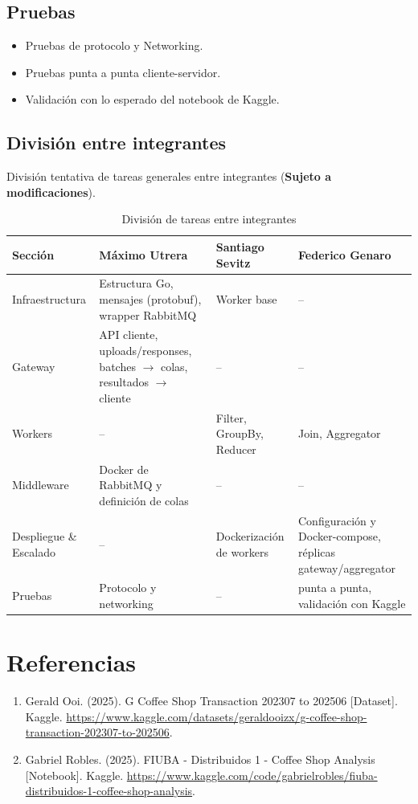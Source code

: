 \subsection{Pruebas}
\begin{itemize}
  \item Pruebas de protocolo y Networking.
  \item Pruebas punta a punta cliente-servidor.
  \item Validación con lo esperado del notebook de Kaggle.
\end{itemize}

\subsection{División entre integrantes}

División tentativa de tareas generales entre integrantes (\textbf{Sujeto a modificaciones}).
\vspace{0.5cm}

\begin{table}[h!]
\centering
\begin{tabular}{|p{3cm}|p{4cm}|p{4cm}|p{4cm}|}
\hline
\textbf{Sección} & \textbf{Máximo Utrera} & \textbf{Santiago Sevitz} & \textbf{Federico Genaro} \\
\hline
Infraestructura & Estructura Go, mensajes (protobuf), wrapper RabbitMQ & Worker base & -- \\
\hline
Gateway & API cliente, uploads/responses, batches $\rightarrow$ colas, resultados $\rightarrow$ cliente & -- & -- \\
\hline
Workers & -- & Filter, GroupBy, Reducer & Join, Aggregator \\
\hline
Middleware & Docker de RabbitMQ y definición de colas & -- & -- \\
\hline
Despliegue \& Escalado & -- & Dockerización de workers & Configuración y Docker-compose, réplicas gateway/aggregator \\
\hline
Pruebas & Protocolo y networking & -- & punta a punta, validación con Kaggle \\
\hline
\end{tabular}
\caption{División de tareas entre integrantes}
\label{tab:division-tareas}
\end{table}

\section{Referencias}

\begin{enumerate}
    \item Gerald Ooi. (2025). G Coffee Shop Transaction 202307 to 202506 [Dataset]. Kaggle. \url{https://www.kaggle.com/datasets/geraldooizx/g-coffee-shop-transaction-202307-to-202506}.
    \item Gabriel Robles. (2025). FIUBA - Distribuidos 1 - Coffee Shop Analysis [Notebook]. Kaggle. \url{https://www.kaggle.com/code/gabrielrobles/fiuba-distribuidos-1-coffee-shop-analysis}.
\end{enumerate}
